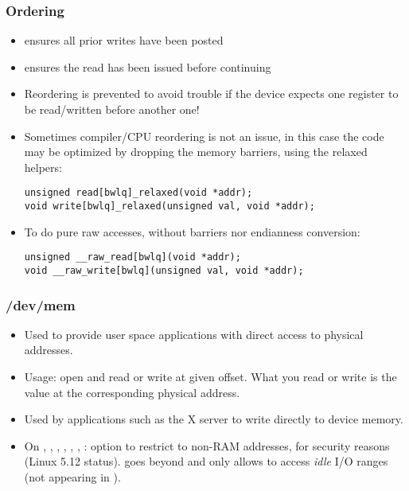 \begin{frame}[fragile]
  \frametitle{Ordering}
  \begin{itemize}
  \item {} ensures all prior writes have been posted
  \item {} ensures the read has been issued before continuing
  \item Reordering is prevented to avoid trouble if the device expects
    one register to be read/written before another one!
  \item Sometimes compiler/CPU reordering is not an issue, in this case
    the code may be optimized by dropping the memory barriers, using the
    relaxed helpers:
\begin{verbatim}
unsigned read[bwlq]_relaxed(void *addr);
void write[bwlq]_relaxed(unsigned val, void *addr);
\end{verbatim}
  \item To do pure raw accesses, without barriers nor endianness
    conversion:
\begin{verbatim}
unsigned __raw_read[bwlq](void *addr);
void __raw_write[bwlq](unsigned val, void *addr);
\end{verbatim}
  \end{itemize}
\end{frame}

\begin{frame}
  \frametitle{/dev/mem}
  \begin{itemize}
  \item Used to provide user space applications with direct access to
    physical addresses.
  \item Usage: open  and read or write at given offset.
    What you read or write is the value at the corresponding physical
    address.
  \item Used by applications such as the X server to write directly to
    device memory.
  \item On , , , ,
    , , :
     option to restrict 
    to non-RAM addresses, for security reasons (Linux 5.12 status).
     goes beyond and only allows to access
    {\em idle} I/O ranges (not appearing in ).
\end{itemize}
\end{frame}
